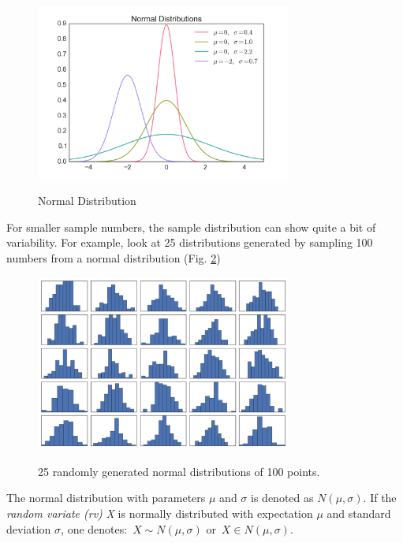 \begin{figure}
  \centering
  \includegraphics[width=0.75\textwidth]{../Images/Normal_Distribution_PDF.png}\\
  \caption{Normal Distribution}\label{fig:normal}
\end{figure}

For smaller sample numbers, the sample distribution can show quite a bit of variability. For example, look at 25 distributions generated by sampling 100 numbers from a normal distribution (Fig. \ref{fig:MultipleNormal})

\begin{figure}
  \centering
  \includegraphics[width=0.75\textwidth]{../Images/Normal_MultHist.png}\\
  \caption{25 randomly generated normal distributions of 100 points.}\label{fig:MultipleNormal}
\end{figure}

The normal distribution with parameters $\mu$ and $\sigma$ is denoted as {$N(\mu,\sigma)$}. If the \emph{random variate (rv)} {\itshape X} is normally distributed with expectation $\mu$ and standard deviation $\sigma$, one denotes: {$\,X \sim N(\mu,\sigma)$} or $\,X \in N(\mu,\sigma)$.


